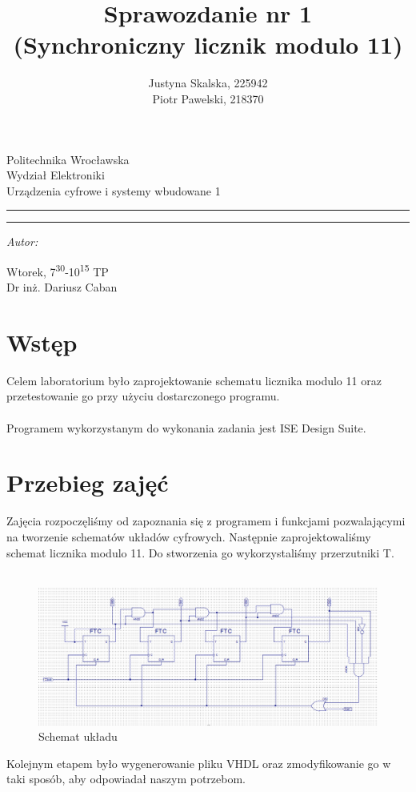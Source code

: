\documentclass[12pt,a4paper,titlepage]{article}
\author{Justyna Skalska, 225942\\
        Piotr Pawelski, 218370}
\title{Sprawozdanie nr 1\\
\large(Synchroniczny licznik modulo 11)}
\makeatletter
\newcommand{\linia}{\rule{\linewidth}{0.4mm}}
\renewcommand{\maketitle}{\begin{titlepage}
    \vspace*{1cm}
    \begin{center}\small
    Politechnika Wrocławska\\
    Wydział Elektroniki\\
    Urządzenia cyfrowe i systemy wbudowane 1
    \end{center}
    \vspace{3cm}
    \noindent\linia
    \begin{center}
      \LARGE \textsc{\@title}
         \end{center}
     \linia
    \vspace{0.5cm}
    \begin{flushright}
    \begin{minipage}{7cm}
    \textit{\small Autor:}\\
    \normalsize \textsc{\@author} \par
    \end{minipage}
    \vspace{5cm}

     {\small Wtorek, 7\textsuperscript{30}-10\textsuperscript{15} TP}\\
        Dr inż. Dariusz Caban
     \end{flushright}
    \vspace*{\stretch{6}}
    \begin{center}
    \@date
    \end{center}
  \end{titlepage}%
}
\makeatother
\begin{document}
\maketitle

\section{Wstęp}
Celem laboratorium było zaprojektowanie schematu licznika modulo 11 oraz przetestowanie go przy użyciu dostarczonego programu.\\\\
Programem wykorzystanym do wykonania zadania jest ISE Design Suite.

\section{Przebieg zajęć}
Zajęcia rozpoczęliśmy od zapoznania się z programem i funkcjami pozwalającymi na tworzenie schematów układów cyfrowych. Następnie zaprojektowaliśmy schemat licznika modulo 11. Do stworzenia go wykorzystaliśmy przerzutniki T.\\\\
\begin{figure}[H]
\centering
\includegraphics[width=13.5cm]{schemat.png}
\caption{Schemat układu}
\label{fig:schemat}
\end{figure}

Kolejnym etapem było wygenerowanie pliku VHDL oraz zmodyfikowanie go w taki sposób, aby odpowiadał naszym potrzebom.
\end{document}
